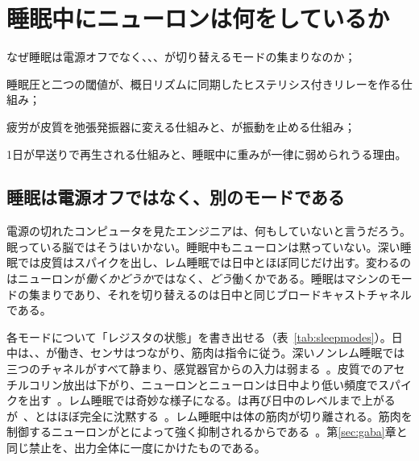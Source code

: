 \chapter{睡眠中にニューロンは何をしているか}
\label{sec:sleep}
\begin{chaptergoals}
\item なぜ睡眠は電源オフでなく、、、が切り替えるモードの集まりなのか；
\item 睡眠圧と二つの閾値が、概日リズムに同期したヒステリシス付きリレーを作る仕組み；
\item 疲労が皮質を弛張発振器に変える仕組みと、が振動を止める仕組み；
\item 1日が早送りで再生される仕組みと、睡眠中に重みが一律に弱められうる理由。
\end{chaptergoals}

\section{睡眠は電源オフではなく、別のモードである}

電源の切れたコンピュータを見たエンジニアは、何もしていないと言うだろう。眠っている脳ではそうはいかない。睡眠中もニューロンは黙っていない。深い睡眠では皮質はスパイクを出し、レム睡眠では日中とほぼ同じだけ出す。変わるのはニューロンが\emph{働くかどうか}ではなく、\emph{どう}働くかである。睡眠はマシンのモードの集まりであり、それを切り替えるのは日中と同じブロードキャストチャネルである。

各モードについて「レジスタの状態」を書き出せる（表~\ref{tab:sleepmodes}）。日中は、、が働き、センサはつながり、筋肉は指令に従う。深いノンレム睡眠では三つのチャネルがすべて静まり、感覚器官からの入力は弱まる~\cite{Hasselmo1999}。皮質でのアセチルコリン放出は下がり、ニューロンとニューロンは日中より低い頻度でスパイクを出す~\cite{Marrosu1995,AstonJonesBloom1981,McGintyHarper1976}。レム睡眠では奇妙な様子になる。は再び日中のレベルまで上がるが~\cite{Marrosu1995}、とはほぼ完全に沈黙する~\cite{AstonJonesBloom1981,McGintyHarper1976,JacobsAzmitia1992}。レム睡眠中は体の筋肉が切り離される。筋肉を制御するニューロンがとによって強く抑制されるからである~\cite{BrooksPeever2012}。第\ref{sec:gaba}章と同じ禁止を、出力全体に一度にかけたものである。

